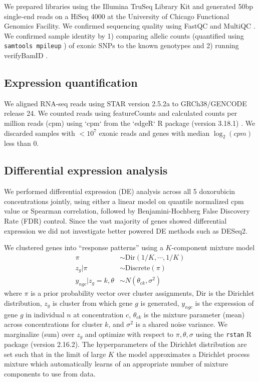 \documentclass{article}
\begin{document}
We prepared libraries using the Illumina TruSeq Library Kit and
generated 50bp single-end reads on a HiSeq 4000 at the University of
Chicago Functional Genomics Facility. 
We confirmed sequencing quality using FastQC and MultiQC
\cite{Ewels2016}. We confirmed sample identity by 1) comparing
allelic counts (quantified using \texttt{samtools mpileup} \cite{li2009sequence}) of exonic SNPs to the known genotypes and 2) running
verifyBamID \cite{Jun2012}.

\subsection*{Expression quantification}

We aligned RNA-seq reads using STAR version 2.5.2a \cite{Dobin2013} to GRCh38/GENCODE release 24. We counted reads using featureCounts \cite{Liao2014} and calculated counts per million reads (cpm) using `cpm` from the `edgeR` R package (version 3.18.1) \cite{Robinson2010}. We discarded samples with $<10^7$ exonic reads and genes with median $\log_2(cpm)$ less than $0$.

\subsection*{Differential expression analysis} 

We performed differential expression (DE) analysis across all 5 doxorubicin concentrations jointly, using either a linear model on quantile normalized cpm value or Spearman correlation, followed by Benjamini-Hochberg False Discovery Rate (FDR) control. Since the vast majority of genes showed differential expression we did not investigate better powered DE methods such as DESeq2. 

We clustered genes into ``response patterns'' using a $K$-component mixture model 
\begin{align}
\pi &\sim \text{Dir}(1/K,\cdots,1/K) \nonumber \\ 
z_g | \pi &\sim \text{Discrete}(\pi) \nonumber \\
y_{ngc} | z_g=k, \theta &\sim N( \theta_{ck}, \sigma^2 )
\label{eq:mixture}
\end{align}
where $\pi$ is a prior probability vector over cluster assignments, Dir is the Dirichlet distribution, $z_g$ is cluster from which gene $g$ is generated, $y_{ngc}$ is the expression of gene $g$ in individual $n$ at concentration $c$, $\theta_{ck}$ is the mixture parameter (mean) across concentrations for cluster $k$, and $\sigma^2$ is a shared noise variance. 
We marginalize (sum) over $z_g$ and optimize with respect to $\pi, \theta, \sigma$ using the \texttt{rstan} R package\cite{carpenter2016stan} (version 2.16.2). 
The hyperparameters of the Dirichlet distribution are set such that in the limit of large $K$ the model approximates a Dirichlet process mixture \cite{maceachern1998estimating} which automatically learns of an appropriate number of mixture components to use from data. 
\end{document}
